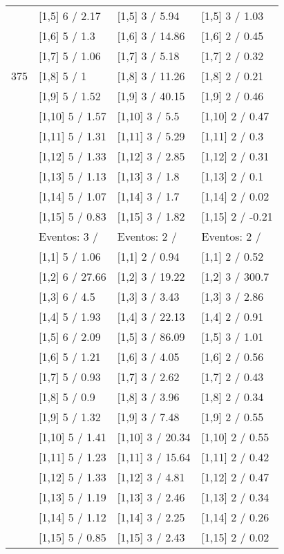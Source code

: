 \begin{table}
\begin{tabular}[t]{llll}
 & {}[1,5] 6  / 2.17 & {}[1,5] 3  / 5.94 & {}[1,5] 3  / 1.03\\
 & {}[1,6] 5  / 1.3 & {}[1,6] 3  / 14.86 & {}[1,6] 2  / 0.45\\
 & {}[1,7] 5  / 1.06 & {}[1,7] 3  / 5.18 & {}[1,7] 2  / 0.32\\
375 & {}[1,8] 5  / 1 & {}[1,8] 3  / 11.26 & {}[1,8] 2  / 0.21\\
\addlinespace
 & {}[1,9] 5  / 1.52 & {}[1,9] 3  / 40.15 & {}[1,9] 2  / 0.46\\
 & {}[1,10] 5  / 1.57 & {}[1,10] 3  / 5.5 & {}[1,10] 2  / 0.47\\
 & {}[1,11] 5  / 1.31 & {}[1,11] 3  / 5.29 & {}[1,11] 2  / 0.3\\
 & {}[1,12] 5  / 1.33 & {}[1,12] 3  / 2.85 & {}[1,12] 2  / 0.31\\
 & {}[1,13] 5  / 1.13 & {}[1,13] 3  / 1.8 & {}[1,13] 2  / 0.1\\
\addlinespace
 & {}[1,14] 5  / 1.07 & {}[1,14] 3  / 1.7 & {}[1,14] 2  / 0.02\\
 & {}[1,15] 5  / 0.83 & {}[1,15] 3  / 1.82 & {}[1,15] 2  / -0.21\\
 & Eventos:  3 / & Eventos:  2 / & Eventos:  2 /\\
 & {}[1,1] 5  / 1.06 & {}[1,1] 2  / 0.94 & {}[1,1] 2  / 0.52\\
 & {}[1,2] 6  / 27.66 & {}[1,2] 3  / 19.22 & {}[1,2] 3  / 300.7\\
\addlinespace
 & {}[1,3] 6  / 4.5 & {}[1,3] 3  / 3.43 & {}[1,3] 3  / 2.86\\
 & {}[1,4] 5  / 1.93 & {}[1,4] 3  / 22.13 & {}[1,4] 2  / 0.91\\
 & {}[1,5] 6  / 2.09 & {}[1,5] 3  / 86.09 & {}[1,5] 3  / 1.01\\
 & {}[1,6] 5  / 1.21 & {}[1,6] 3  / 4.05 & {}[1,6] 2  / 0.56\\
 & {}[1,7] 5  / 0.93 & {}[1,7] 3  / 2.62 & {}[1,7] 2  / 0.43\\
\addlinespace
500 & {}[1,8] 5  / 0.9 & {}[1,8] 3  / 3.96 & {}[1,8] 2  / 0.34\\
 & {}[1,9] 5  / 1.32 & {}[1,9] 3  / 7.48 & {}[1,9] 2  / 0.55\\
 & {}[1,10] 5  / 1.41 & {}[1,10] 3  / 20.34 & {}[1,10] 2  / 0.55\\
 & {}[1,11] 5  / 1.23 & {}[1,11] 3  / 15.64 & {}[1,11] 2  / 0.42\\
 & {}[1,12] 5  / 1.33 & {}[1,12] 3  / 4.81 & {}[1,12] 2  / 0.47\\
\addlinespace
 & {}[1,13] 5  / 1.19 & {}[1,13] 3  / 2.46 & {}[1,13] 2  / 0.34\\
 & {}[1,14] 5  / 1.12 & {}[1,14] 3  / 2.25 & {}[1,14] 2  / 0.26\\
 & {}[1,15] 5  / 0.85 & {}[1,15] 3  / 2.43 & {}[1,15] 2  / 0.02\\
\bottomrule
\end{tabular}
\end{table}

